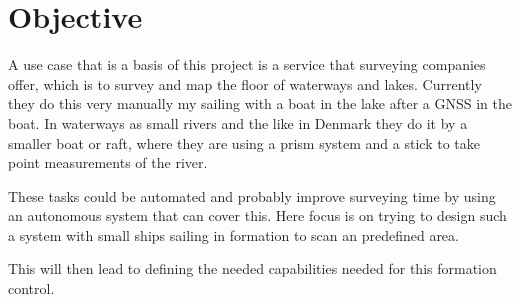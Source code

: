 \section{Objective}


A use case that is a basis of this project is a service that surveying
companies offer, which is to survey and map the floor of waterways and
lakes. Currently they do this very manually my sailing with a boat in
the lake after a \ac{GNSS} in the boat. In waterways as small rivers
and the like in Denmark they do it by a smaller boat or raft, where
they are using a prism system and a stick to take point measurements
of the river.

These tasks could be automated and probably improve surveying time by
using an autonomous system that can cover this. Here focus is on
trying to design such a system with small ships sailing in formation
to scan an predefined area.

This will then lead to defining the needed capabilities needed for
this formation control.


